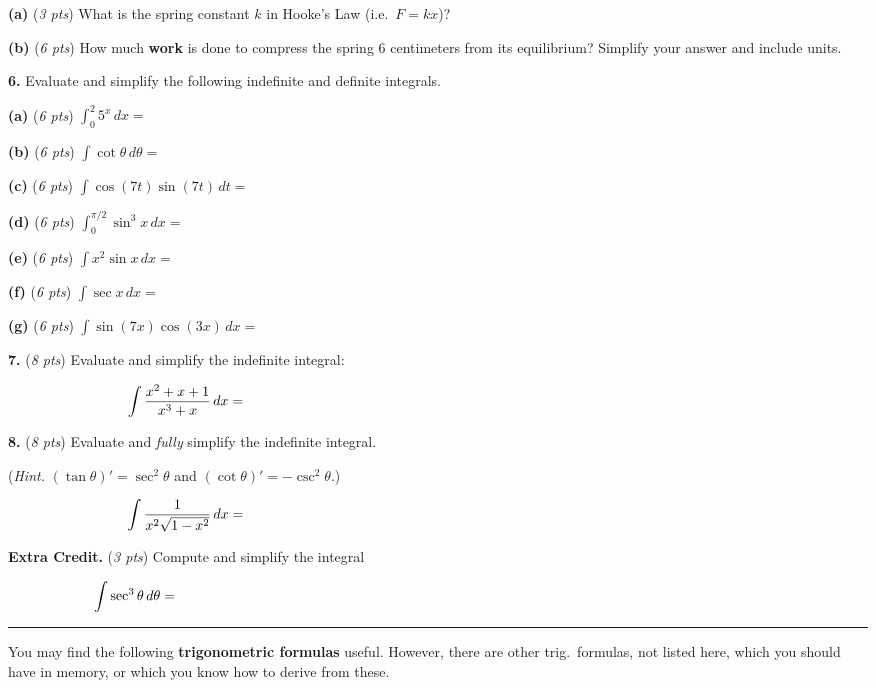 \documentclass[11pt]{amsart}
\newcommand{\ds}{\displaystyle}
\newcommand{\prob}[1]{\bigskip\noindent\textbf{#1.} }
\newcommand{\pts}[1]{(\emph{#1 pts})}
\newcommand{\probpts}[2]{\prob{#1} \pts{#2} \quad}
\newcommand{\epartpts}[2]{\medskip\noindent \textbf{(#1)} \pts{#2} \quad}
\begin{document}
\epartpts{a}{3} What is the spring constant $k$ in Hooke's Law (i.e.~$F=kx$)?

\vspace{1.5in}

\epartpts{b}{6} How much \textbf{work} is done to compress the spring $6$ centimeters from its equilibrium? Simplify your answer and include units.


\vfill

\clearpage\newpage
\prob{6}  Evaluate and simplify the following indefinite and definite integrals.

\epartpts{a}{6}  $\ds \int_0^2 5^x \,dx = $
\vfill

\epartpts{b}{6}  $\ds \int \cot \theta\,d\theta = $
\vfill

\epartpts{c}{6}  $\ds \int \cos (7t) \sin (7t) \,dt = $
\vfill

\clearpage\newpage
\epartpts{d}{6}  $\ds \int_0^{\pi/2} \sin^3 x \,dx = $
\vfill

\epartpts{e}{6}  $\ds \int x^2 \sin x\,dx = $
\vfill

\clearpage\newpage
\epartpts{f}{6}  $\ds \int \sec x\,dx = $
\vfill

\epartpts{g}{6}  $\ds \int \sin(7x)\cos(3x)\,dx = $
\vfill

\clearpage\newpage
\probpts{7}{8}  Evaluate and simplify the indefinite integral:

\medskip
    $$\int \frac{x^2+x+1}{x^3+x}\,dx = \hspace{5.0in}$$
\vfill

\probpts{8}{8}  Evaluate and \emph{fully} simplify the indefinite integral.

\noindent (\emph{Hint.} $(\tan \theta)' = \sec^2\theta$ and $(\cot\theta)' = - \csc^2\theta$.)

\medskip
    $$\int \frac{1}{x^2\sqrt{1-x^2}}\,dx = \hspace{5.0in}$$
\vfill

\clearpage\newpage
\probpts{Extra Credit}{3}  Compute and simplify the integral

\medskip
    $$\int \sec^3 \theta\,d\theta = \hspace{6.0in}$$
\vfill

\noindent \hrule

\vspace{0.2in}
\noindent You may find the following \textbf{trigonometric formulas} useful.  However, there are other trig.~formulas, not listed here, which you should have in memory, or which you know how to derive from these.
\end{document}
